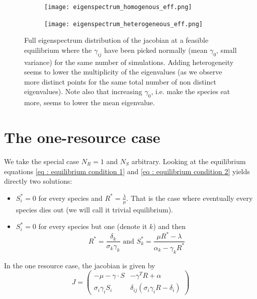 \documentclass[12pt, titlepage]{report}
\begin{document}
	\begin{figure}
		\centering
		\begin{subfigure}{0.49\textwidth}
			\texttt{[image: eigenspectrum\_homogenous\_eff.png]}
		\end{subfigure}
		\begin{subfigure}{0.49\textwidth}
			\texttt{[image: eigenspectrum\_heterogeneous\_eff.png]}
		\end{subfigure}
		\caption{Full eigenspectrum distribution of the jacobian at a feasible equilibrium where the $\gamma_{ij}$ have been picked normally (mean $\gamma_0$, small variance) for the same number of simulations. Adding heterogeneity seems to lower the multiplicity of the eigenvalues (as we observe more distinct points for the same total number of non distinct eigenvalues). Note also that increasing $\gamma_0$, i.e. make the species eat more, seems to lower the mean eigenvalue. }\label{fig : effect heterogeneity eigenspectrum}
	\end{figure}

	\clearpage
	\section{The one-resource case}
	We take the special case $N_R = 1$ and $N_S$ arbitrary. Looking at the equilibrium equations \eqref{eq : equilibrium condition 1} and \eqref{eq : equilibrium condition 2} yields directly two solutions:
	\begin{itemize}
		\item $S^*_i = 0 $ for every species and $R^* = \frac{\lambda}{\mu}$. That is the case where eventually every species dies out (we will call it trivial equilibrium).
		\item $S^*_i = 0$ for every species but one (denote it $k$) and then $$R^* = \frac{\delta_k}{\sigma_k \gamma_k}  \text{ and } S^*_k = \frac{\mu R^* - \lambda}{\alpha_k - \gamma_k R^*}$$
	\end{itemize}

	In the one resource case, the jacobian is given by
	\begin{equation}
		J =
		\begin{pmatrix}
			- \mu - \gamma \cdot S & -\gamma^T R + \alpha \\
			\sigma_i \gamma_i S_i & \delta_{ij}(\sigma_i \gamma_i R - \delta_i)
		\end{pmatrix}
	\end{equation}
\end{document}
